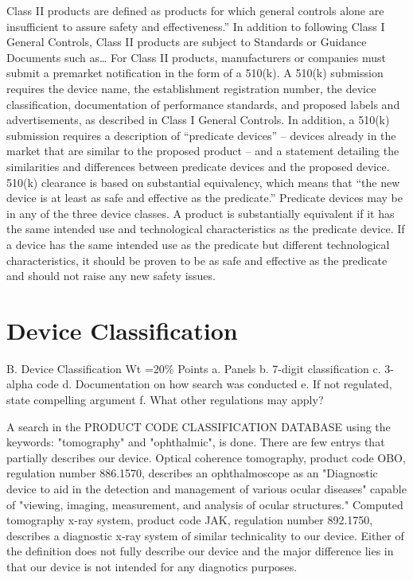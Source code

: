 \documentclass{article}
\begin{document}
Class II products are defined as products for which general controls
alone are insufficient to assure safety and effectiveness.” In
addition to following Class I General Controls, Class II products are
subject to Standards or Guidance Documents such as… For Class II
products, manufacturers or companies must submit a premarket
notification in the form of a 510(k). A 510(k) submission requires the
device name, the establishment registration number, the device
classification, documentation of performance standards, and proposed
labels and advertisements, as described in Class I General
Controls. In addition, a 510(k) submission requires a description of
“predicate devices” – devices already in the market that are similar
to the proposed product – and a statement detailing the similarities
and differences between predicate devices and the proposed
device. 510(k) clearance is based on substantial equivalency, which
means that “the new device is at least as safe and effective as the
predicate.” Predicate devices may be in any of the three device
classes. A product is substantially equivalent if it has the same
intended use and technological characteristics as the predicate
device. If a device has the same intended use as the predicate but
different technological characteristics, it should be proven to be as
safe and effective as the predicate and should not raise any new
safety issues.
	 

\section{Device Classification}
\label{sec:protocols}

B. Device Classification Wt =20\% Points
a. Panels
b. 7-digit classification
c. 3-alpha code
d. Documentation on how search was conducted
e. If not regulated, state compelling argument
f. What other regulations may apply?

A search in the PRODUCT CODE CLASSIFICATION DATABASE using the
keywords: "tomography" and "ophthalmic", is done. There are few entrys
that partially describes our device. Optical coherence tomography,
product code OBO, regulation number 886.1570, describes an
ophthalmoscope as an "Diagnostic device to aid in the detection and
management of various ocular diseases" capable of "viewing, imaging,
measurement, and analysis of ocular structures."  Computed tomography
x-ray system, product code JAK, regulation number 892.1750, describes
a diagnostic x-ray system of similar technicality to our
device. Either of the definition does not fully describe our device
and the major difference lies in that our device is not intended for
any diagnotics purposes.
\end{document}
